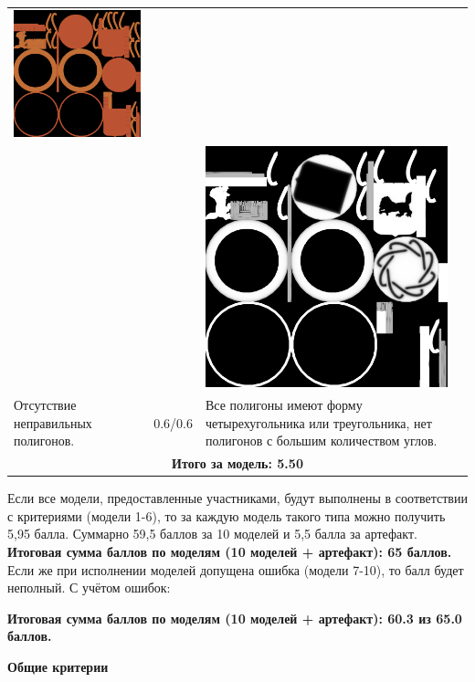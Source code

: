 \begin{longtable}{|p{4cm}|p{2.5cm}|p{7.5cm}|}
    \includegraphics[width=7cm]{src/tec_a1} \\
    & & \includegraphics[width=7cm]{src/tec_a2}\\
    \hline   
    Отсутствие неправильных полигонов. & 0.6/0.6 & Все полигоны имеют форму четырехугольника или треугольника, нет полигонов с большим количеством углов. \\
    \hline
    \multicolumn{3}{|c|}{\textbf{Итого за модель: 5.50}} \\
    \hline    
\end{longtable}

Если все модели, предоставленные участниками, будут выполнены в соответствии с критериями (модели 1-6), то за каждую модель такого типа можно получить 5,95 балла. Суммарно 59,5 баллов за 10 моделей и 5,5 балла за артефакт. \textbf{Итоговая сумма баллов по моделям (10 моделей + артефакт): 65 баллов.}
Если же при исполнении моделей допущена ошибка (модели 7-10), то балл будет неполный. С учётом ошибок:

\textbf{Итоговая сумма баллов по моделям (10 моделей + артефакт): 60.3 из 65.0 баллов.}

\begin{center}
    \textbf{Общие критерии}
\end{center}

